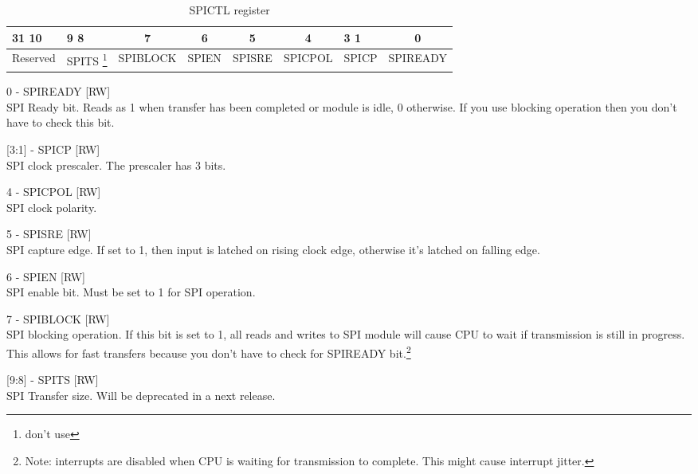 \begin{table}[H]
\begin{center}
\begin{tabularx}{14cm}{XXccccXc}
31 \hfill 10 & 9 \hfill 8 & 7 & 6 & 5 & 4 & 3 \hfill 1 & 0 \\

\hline
\multicolumn{1}{|c|}{\tiny Reserved} &
\multicolumn{1}{|c|}{\tiny SPITS \footnote{don't use}} &
\multicolumn{1}{|c|}{\tiny SPIBLOCK} &
\multicolumn{1}{|c|}{\tiny SPIEN}  &
\multicolumn{1}{|c|}{\tiny SPISRE}  &
\multicolumn{1}{|c|}{\tiny SPICPOL}  &
\multicolumn{1}{|c|}{\tiny SPICP}  &
\multicolumn{1}{|c|}{\tiny SPIREADY}  \\

\hline
\end{tabularx}
\caption{SPICTL register}
\end{center}
\end{table}


\begin{description}
\item{0 - SPIREADY [RW]} \hfill \\ SPI Ready bit. Reads as 1 when transfer has been completed or module is idle, 0 otherwise. If you use blocking operation
then you don't have to check this bit.
\item{[3:1] - SPICP [RW]}\hfill \\  SPI clock prescaler. The prescaler has 3 bits.
\item{4 - SPICPOL [RW]}\hfill \\  SPI clock polarity.
\item{5 - SPISRE [RW]}\hfill \\  SPI capture edge. If set to 1, then input is latched on rising clock edge, otherwise it's latched on falling edge.
\item{6 - SPIEN [RW]}\hfill \\  SPI enable bit. Must be set to 1 for SPI operation.
\item{7 - SPIBLOCK [RW]}\hfill \\  SPI blocking operation. If this bit is set to 1, all reads and writes to SPI module will cause CPU to wait if transmission is
still in progress. This allows for fast transfers because you don't have to check for SPIREADY bit.\footnote{Note: interrupts are disabled when CPU is waiting for transmission to complete. This might cause interrupt jitter.}
\item{[9:8] - SPITS [RW]}\hfill \\  SPI Transfer size. Will be deprecated in a next release.
\end{description}


